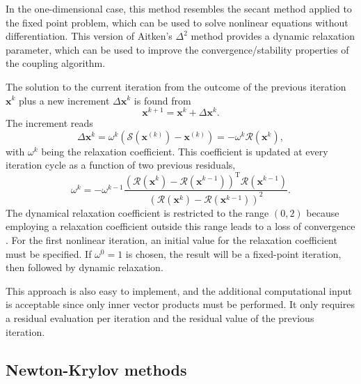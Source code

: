           In the one-dimensional case, this method resembles the secant method applied to the fixed point problem, which can be used to solve nonlinear equations without differentiation.
          This version of Aitken's \(\Delta^2\) method provides a dynamic relaxation parameter, which can be used to improve the convergence/stability properties of the coupling algorithm.

          The solution to the current iteration from the outcome of the previous iteration $\mathbf{x}^{k}$ plus a new increment $\Delta \mathbf{x}^{k}$ is found from
          \begin{equation}
            \mathbf{x}^{k+1}=\mathbf{x}^{k}+\Delta \mathbf{x}^{k}.
          \end{equation}
          The increment reads
          \begin{equation} \label{eq:aitken_update}
            \Delta \mathbf{x}^{k}=\omega^{k}\left(\bm{\mathcal{S}}(\mathbf{x}^{(k)})-\mathbf{x}^{(k)}\right)=-\omega^{k} \bm{\mathcal{R}}(\mathbf{x}^k),
          \end{equation}
          with $\omega^{k}$ being the relaxation coefficient.
          This coefficient is updated at every iteration cycle as a function of two previous residuals,
          \begin{equation} \label{eq:aitken_relaxation_factor}
            \omega^{k}=-\omega^{k-1} \frac{\left(\bm{\mathcal{R}}(\mathbf{x}^k)-\bm{\mathcal{R}}(\mathbf{x}^{k-1})\right)^{\mathrm{T}} \bm{\mathcal{R}}(\mathbf{x}^{k-1})}{\left(\bm{\mathcal{R}}(\mathbf{x}^k)-\bm{\mathcal{R}}(\mathbf{x}^{k-1})\right)^{2}}.
          \end{equation}
          The dynamical relaxation coefficient is restricted to the range \((0,2)\) because employing a relaxation coefficient outside this range leads to a loss of convergence \citep{erbts_accelerated_2012}.
          For the first nonlinear iteration, an initial value for the relaxation coefficient must be specified.
          If $\omega^{0}=1$ is chosen, the result will be a fixed-point iteration, then followed by dynamic relaxation.

          This approach is also easy to implement, and the additional computational input is acceptable since only inner vector products must be performed.
          It only requires a residual evaluation per iteration and the residual value of the previous iteration.

          \subsection{Newton-Krylov methods} \label{sec:newton_krylov}

